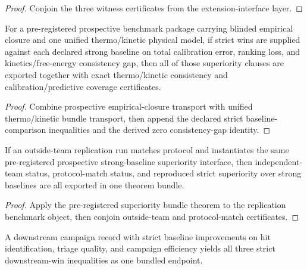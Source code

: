 \begin{proof}
Conjoin the three witness certificates from the extension-interface layer.
\end{proof}

\begin{theorem}\label{thm:preregistered-prospective-beats-strong-baselines}
For a pre-registered prospective benchmark package carrying blinded empirical closure and one unified thermo/kinetic physical model, if strict wins are supplied against each declared strong baseline on total calibration error, ranking loss, and kinetics/free-energy consistency gap, then all of those superiority clauses are exported together with exact thermo/kinetic consistency and calibration/predictive coverage certificates.
\end{theorem}

\begin{proof}
Combine prospective empirical-closure transport with unified thermo/kinetic bundle transport, then append the declared strict baseline-comparison inequalities and the derived zero consistency-gap identity.
\end{proof}

\begin{theorem}\label{thm:independent-replication-outside-team-bundle}
If an outside-team replication run matches protocol and instantiates the same pre-registered prospective strong-baseline superiority interface, then independent-team status, protocol-match status, and reproduced strict superiority over strong baselines are all exported in one theorem bundle.
\end{theorem}

\begin{proof}
Apply the pre-registered superiority bundle theorem to the replication benchmark object, then conjoin outside-team and protocol-match certificates.
\end{proof}

\begin{theorem}\label{thm:downstream-campaign-win-bundle}
A downstream campaign record with strict baseline improvements on hit identification, triage quality, and campaign efficiency yields all three strict downstream-win inequalities as one bundled endpoint.
\end{theorem}

